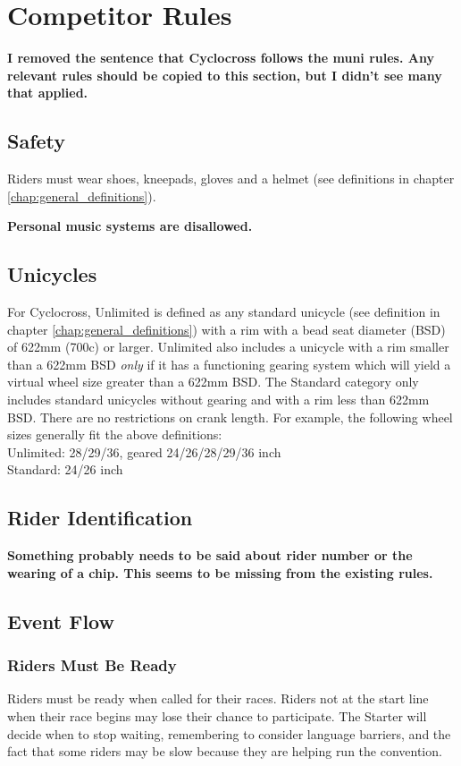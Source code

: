 \chapter{Competitor Rules}

\textbf{I removed the sentence that Cyclocross follows the muni rules. Any relevant rules should be copied to this section, but I didn't see many that applied.}

\section{Safety}
Riders must wear shoes, kneepads, gloves and a helmet (see definitions in chapter \ref{chap:general_definitions}).

\textbf{Personal music systems are disallowed.}

\section{Unicycles}

For Cyclocross, Unlimited is defined as any standard unicycle (see definition in chapter \ref{chap:general_definitions}) with a rim with a bead seat diameter (BSD) of 622mm (700c) or larger.
Unlimited also includes a unicycle with a rim smaller than a 622mm BSD {\em only} if it has a functioning gearing system which will yield a virtual wheel size greater than a 622mm BSD.
The Standard category only includes standard unicycles without gearing and with a rim less than 622mm BSD.
There are no restrictions on crank length.
For example, the following wheel sizes generally fit the above definitions: \\
Unlimited: 28/29/36, geared 24/26/28/29/36 inch \\
Standard: 24/26 inch

\section{Rider Identification}

\textbf{Something probably needs to be said about rider number or the wearing of a chip.  This seems to be missing from the existing rules.}

\section{Event Flow}

\subsection{Riders Must Be Ready}
Riders must be ready when called for their races.
Riders not at the start line when their race begins may lose their chance to participate.
The Starter will decide when to stop waiting, remembering to consider language barriers, and the fact that some riders may be slow because they are helping run the convention.

